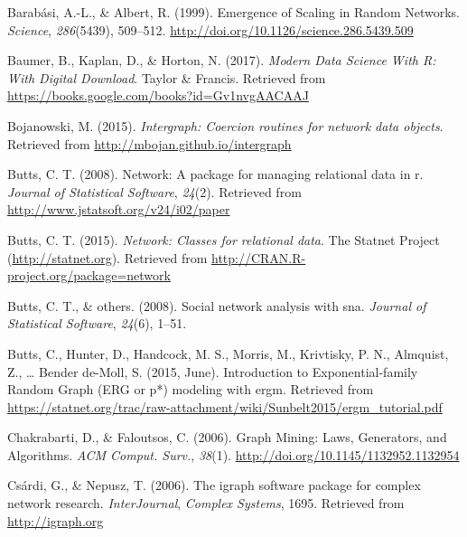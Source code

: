 \documentclass[12pt,twoside]{amherstthesis}
\begin{document}
  \setlength{\parindent}{-0.20in} \setlength{\leftskip}{0.20in}
  \setlength{\parskip}{8pt}
  
  \hypertarget{refs}{}
  \hypertarget{ref-barabasi_emergence_1999}{}
  Barabási, A.-L., \& Albert, R. (1999). Emergence of Scaling in Random
  Networks. \emph{Science}, \emph{286}(5439), 509--512.
  \url{http://doi.org/10.1126/science.286.5439.509}
  
  \hypertarget{ref-baumer_modern_2017}{}
  Baumer, B., Kaplan, D., \& Horton, N. (2017). \emph{Modern Data Science
  With R: With Digital Download}. Taylor \& Francis. Retrieved from
  \url{https://books.google.com/books?id=Gv1nvgAACAAJ}
  
  \hypertarget{ref-intergraphpackagemanual}{}
  Bojanowski, M. (2015). \emph{Intergraph: Coercion routines for network
  data objects}. Retrieved from \url{http://mbojan.github.io/intergraph}
  
  \hypertarget{ref-networkpackagearticle}{}
  Butts, C. T. (2008). Network: A package for managing relational data in
  r. \emph{Journal of Statistical Software}, \emph{24}(2). Retrieved from
  \url{http://www.jstatsoft.org/v24/i02/paper}
  
  \hypertarget{ref-networkpackagemanual}{}
  Butts, C. T. (2015). \emph{Network: Classes for relational data}. The
  Statnet Project (\url{http://statnet.org}). Retrieved from
  \url{http://CRAN.R-project.org/package=network}
  
  \hypertarget{ref-butts2008social}{}
  Butts, C. T., \& others. (2008). Social network analysis with sna.
  \emph{Journal of Statistical Software}, \emph{24}(6), 1--51.
  
  \hypertarget{ref-butts_introduction_2015}{}
  Butts, C., Hunter, D., Handcock, M. S., Morris, M., Krivtisky, P. N.,
  Almquist, Z., \ldots{} Bender de-Moll, S. (2015, June). Introduction to
  Exponential-family Random Graph (ERG or p*) modeling with ergm.
  Retrieved from
  \url{https://statnet.org/trac/raw-attachment/wiki/Sunbelt2015/ergm_tutorial.pdf}
  
  \hypertarget{ref-chakrabarti_graph_2006}{}
  Chakrabarti, D., \& Faloutsos, C. (2006). Graph Mining: Laws,
  Generators, and Algorithms. \emph{ACM Comput. Surv.}, \emph{38}(1).
  \url{http://doi.org/10.1145/1132952.1132954}
  
  \hypertarget{ref-igraphpackage}{}
  Csárdi, G., \& Nepusz, T. (2006). The igraph software package for
  complex network research. \emph{InterJournal}, \emph{Complex Systems},
  1695. Retrieved from \url{http://igraph.org}
  
\end{document}
